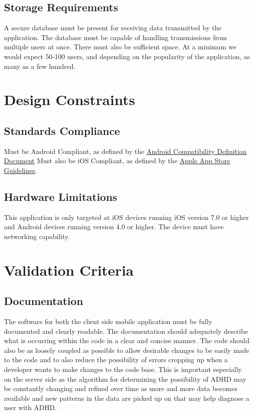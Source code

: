 \documentclass[a4wide]{article}
\begin{document}
\subsection{Storage Requirements}
A secure database must be present for receiving data transmitted by the
application.  The database must be capable of handling transmissions from
multiple users at once.  There must also be sufficient space.  At a minimum we
would expect 50-100 users, and depending on the popularity of the application,
as many as a few hundred.



\section{Design Constraints}

\subsection{Standards Compliance}

Must be Android Compliant, as defined by the \href{http://static.googleusercontent.com/media/source.android.com/en/us/compatibility/4.0/android-4.0-cdd.pdf}{Android Compatibility Definition Document}
Must also be iOS Compliant, as defined by the \href{https://developer.apple.com/app-store/review/guidelines/}{Apple App Store Guidelines}.

\subsection{Hardware Limitations}

This application is only targeted at iOS devices running iOS version 7.0 or
higher and Android devices running version 4.0 or higher. The device must have
networking capability.





\section{Validation Criteria}

\subsection{Documentation}
The software for both the client side mobile application must be fully
documented and clearly readable. The documentation should adequately describe
what is occurring within the code in a clear and concise manner. The code should
also be as loosely coupled as possible to allow desirable changes to be easily
made to the code and to also reduce the possibility of errors cropping up when
a developer wants to make changes to the code base. This is important especially
on the server side as the algorithm for determining the possibility of ADHD may
be constantly changing and refined over time as more and more data becomes
available and new patterns in the data are picked up on that may help diagnose a
user with ADHD.
\end{document}
